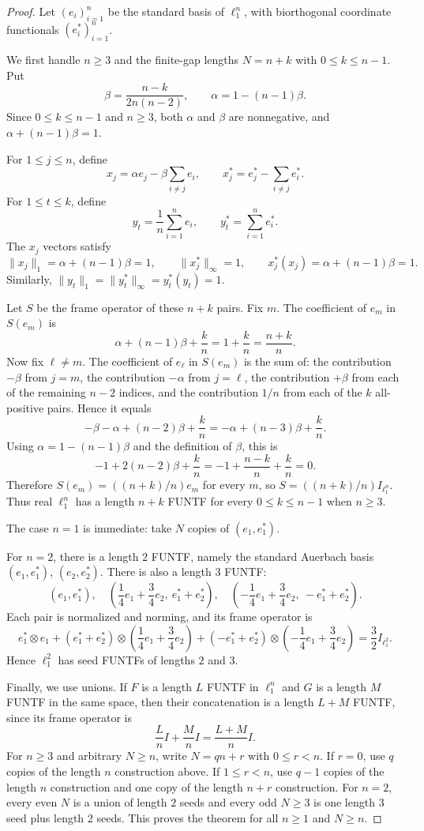 \documentclass[11pt]{article}
\begin{document}
\begin{proof}
Let $(e_i)_{i=1}^n$ be the standard basis of $\ell_1^n$, with biorthogonal
coordinate functionals $(e_i^*)_{i=1}^n$.

We first handle $n\ge 3$ and the finite-gap lengths $N=n+k$ with
$0\le k\le n-1$. Put
\[
  \beta=\frac{n-k}{2n(n-2)},
  \qquad
  \alpha=1-(n-1)\beta.
\]
Since $0\le k\le n-1$ and $n\ge 3$, both $\alpha$ and $\beta$ are
nonnegative, and $\alpha+(n-1)\beta=1$.

For $1\le j\le n$, define
\[
  x_j=\alpha e_j-\beta\sum_{i\ne j}e_i,
  \qquad
  x_j^*=e_j^*-\sum_{i\ne j}e_i^*.
\]
For $1\le t\le k$, define
\[
  y_t=\frac1n\sum_{i=1}^n e_i,
  \qquad
  y_t^*=\sum_{i=1}^n e_i^*.
\]
The $x_j$ vectors satisfy
\[
  \|x_j\|_1=\alpha+(n-1)\beta=1,\qquad
  \|x_j^*\|_\infty=1,\qquad
  x_j^*(x_j)=\alpha+(n-1)\beta=1.
\]
Similarly, $\|y_t\|_1=\|y_t^*\|_\infty=y_t^*(y_t)=1$.

Let $S$ be the frame operator of these $n+k$ pairs. Fix $m$. The coefficient
of $e_m$ in $S(e_m)$ is
\[
  \alpha+(n-1)\beta+\frac{k}{n}
  =1+\frac{k}{n}
  =\frac{n+k}{n}.
\]
Now fix $\ell\ne m$. The coefficient of $e_\ell$ in $S(e_m)$ is the sum of:
the contribution $-\beta$ from $j=m$, the contribution $-\alpha$ from
$j=\ell$, the contribution $+\beta$ from each of the remaining $n-2$ indices,
and the contribution $1/n$ from each of the $k$ all-positive pairs. Hence it
equals
\[
  -\beta-\alpha+(n-2)\beta+\frac{k}{n}
  =
  -\alpha+(n-3)\beta+\frac{k}{n}.
\]
Using $\alpha=1-(n-1)\beta$ and the definition of $\beta$, this is
\[
  -1+2(n-2)\beta+\frac{k}{n}
  =
  -1+\frac{n-k}{n}+\frac{k}{n}
  =0.
\]
Therefore $S(e_m)=((n+k)/n)e_m$ for every $m$, so
$S=((n+k)/n)I_{\ell_1^n}$. Thus real $\ell_1^n$ has a length $n+k$ FUNTF
for every $0\le k\le n-1$ when $n\ge 3$.

The case $n=1$ is immediate: take $N$ copies of $(e_1,e_1^*)$.

For $n=2$, there is a length $2$ FUNTF, namely the standard Auerbach basis
$(e_1,e_1^*)$, $(e_2,e_2^*)$. There is also a length $3$ FUNTF:
\[
  (e_1,e_1^*),
  \quad
  \left(\frac14e_1+\frac34e_2,\ e_1^*+e_2^*\right),
  \quad
  \left(-\frac14e_1+\frac34e_2,\ -e_1^*+e_2^*\right).
\]
Each pair is normalized and norming, and its frame operator is
\[
  e_1^*\otimes e_1
  +(e_1^*+e_2^*)\otimes\left(\frac14e_1+\frac34e_2\right)
  +(-e_1^*+e_2^*)\otimes\left(-\frac14e_1+\frac34e_2\right)
  =\frac32 I_{\ell_1^2}.
\]
Hence $\ell_1^2$ has seed FUNTFs of lengths $2$ and $3$.

Finally, we use unions. If $F$ is a length $L$ FUNTF in $\ell_1^n$ and $G$
is a length $M$ FUNTF in the same space, then their concatenation is a length
$L+M$ FUNTF, since its frame operator is
\[
  \frac{L}{n}I+\frac{M}{n}I=\frac{L+M}{n}I.
\]
For $n\ge 3$ and arbitrary $N\ge n$, write $N=qn+r$ with
$0\le r<n$. If $r=0$, use $q$ copies of the length $n$ construction above.
If $1\le r<n$, use $q-1$ copies of the length $n$ construction and one copy
of the length $n+r$ construction. For $n=2$, every even $N$ is a union of
length $2$ seeds and every odd $N\ge 3$ is one length $3$ seed plus length
$2$ seeds. This proves the theorem for all $n\ge 1$ and $N\ge n$.
\end{proof}
\end{document}
